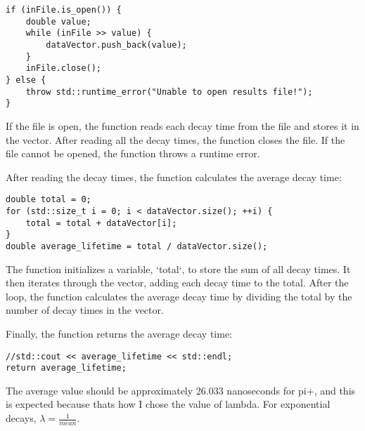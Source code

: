 \documentclass{article}
\begin{document}
\begin{verbatim}
if (inFile.is_open()) {
    double value;
    while (inFile >> value) {
        dataVector.push_back(value);
    }
    inFile.close();
} else {
    throw std::runtime_error("Unable to open results file!");
}
\end{verbatim}

If the file is open, the function reads each decay time from the file and stores it in the vector. After reading all the decay times, the function closes the file. If the file cannot be opened, the function throws a runtime error.

After reading the decay times, the function calculates the average decay time:

\begin{verbatim}
double total = 0;
for (std::size_t i = 0; i < dataVector.size(); ++i) {
    total = total + dataVector[i];
}
double average_lifetime = total / dataVector.size();
\end{verbatim}

The function initializes a variable, `total`, to store the sum of all decay times. It then iterates through the vector, adding each decay time to the total. After the loop, the function calculates the average decay time by dividing the total by the number of decay times in the vector.

Finally, the function returns the average decay time:

\begin{verbatim}
//std::cout << average_lifetime << std::endl;
return average_lifetime;
\end{verbatim}

The average value should be approximately 26.033 nanoseconds for pi+, and this is expected because thats how I chose the value of lambda. For exponential decays, $\lambda = \frac{1}{mean}$.
\end{document}
